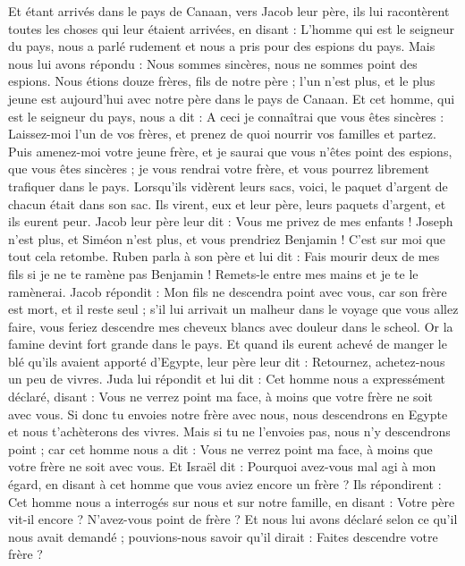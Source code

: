 \begin{multicols}{2}
Et étant arrivés dans le pays de Canaan, vers Jacob leur père, ils lui racontèrent toutes les choses qui leur étaient arrivées, en disant :
L'homme qui est le seigneur du pays, nous a parlé rudement et nous a pris pour des espions du pays.
Mais nous lui avons répondu : Nous sommes sincères, nous ne sommes point des espions.
Nous étions douze frères, fils de notre père ; l'un n'est plus, et le plus jeune est aujourd'hui avec notre père dans le pays de Canaan.
Et cet homme, qui est le seigneur  du pays, nous a dit : A ceci je connaîtrai que vous êtes sincères : Laissez-moi l'un de vos frères, et prenez de quoi nourrir vos familles et partez.
Puis amenez-moi votre jeune frère, et je saurai que vous n'êtes point des espions, que vous êtes sincères ; je vous rendrai votre frère, et vous pourrez librement trafiquer dans le  pays.
Lorsqu’ils vidèrent leurs sacs, voici, le paquet d’argent de chacun était dans son sac. Ils virent, eux et leur père, leurs paquets d’argent, et ils eurent peur.
Jacob leur père leur dit : Vous me privez de mes enfants ! Joseph n'est plus, et Siméon n'est plus, et vous prendriez Benjamin ! C’est sur moi que tout cela retombe.
Ruben parla à son père et lui dit : Fais mourir deux de mes fils si je ne te ramène pas Benjamin ! Remets-le entre mes mains et je te le ramènerai.
Jacob répondit : Mon fils ne descendra point avec vous, car son frère est mort, et il reste seul ; s’il lui arrivait un malheur dans le voyage que vous allez faire, vous feriez descendre mes cheveux blancs avec douleur dans le scheol.
\VerseOne{}Or la famine devint fort grande dans le pays.
Et quand  ils eurent achevé de manger le blé qu'ils avaient apporté d'Egypte, leur père leur dit : Retournez, achetez-nous un peu de vivres.
Juda lui répondit et lui dit : Cet homme nous a expressément déclaré, disant : Vous ne verrez point ma face, à moins que votre frère ne soit avec vous.
Si donc tu envoies notre frère avec nous, nous descendrons en Egypte et nous t'achèterons des vivres.
Mais si tu ne l'envoies pas, nous n'y descendrons point ; car cet homme nous a dit : Vous ne verrez point ma face, à moins que votre frère ne soit avec vous.
Et Israël dit : Pourquoi avez-vous mal agi à mon égard, en disant à cet homme que vous aviez encore un frère ?
Ils répondirent : Cet homme nous a interrogés sur nous et sur notre famille, en disant : Votre père vit-il encore ? N'avez-vous point de frère ? Et nous lui avons déclaré selon ce qu'il nous avait demandé ; pouvions-nous savoir qu'il dirait : Faites descendre votre frère ?

\end{multicols}

